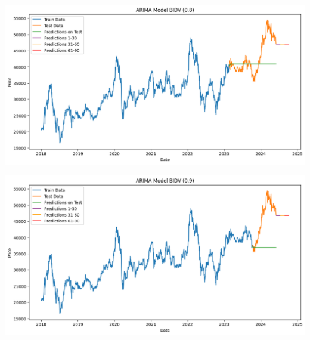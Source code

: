 \documentclass[conference]{IEEEtran}
\begin{document}
\begin{minipage}{0.23\textwidth}
    \centering
    \includegraphics[width=\linewidth]{images/ARIMA/ARIMA_BIDV_82.png}
    \label{fig:image1}
\end{minipage}
\hfill
\begin{minipage}{0.23\textwidth}
    \centering
    \includegraphics[width=\linewidth]{images/ARIMA/ARIMA_BIDV_91.png}
    \label{fig:image2}
\end{minipage}
\end{document}
